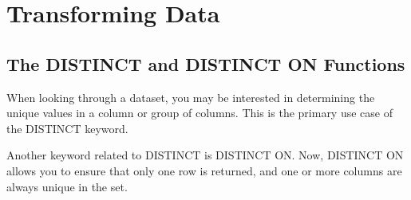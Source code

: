 \section{Transforming Data}
\subsection{The DISTINCT and DISTINCT ON Functions}
When looking through a dataset, you may be interested in determining the unique values in a column or group of columns. This is the primary use case of the DISTINCT keyword.

Another keyword related to DISTINCT is DISTINCT ON. Now, DISTINCT ON allows you to ensure that only one row is returned, and one or more columns are always unique in the set.